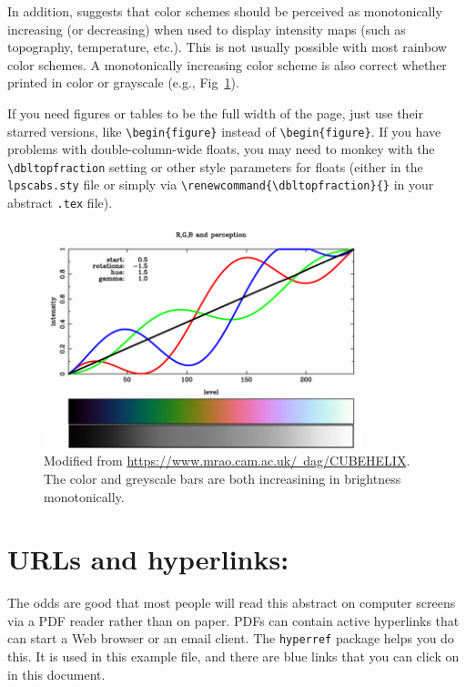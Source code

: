 \documentclass[twoside, 10pt]{article}
\begin{document}
In addition, \citep{green2011colour} suggests that color schemes
should be perceived as monotonically increasing (or decreasing)
when used to display intensity maps (such as
topography, temperature, etc.). This is not usually possible with 
most rainbow color schemes. A monotonically increasing color scheme 
is also correct whether printed in color or grayscale (e.g., Fig~\ref{SaturationColors}).

If you need figures or tables to be the full width of the page,
just use their starred versions, like \verb=\begin{figure}= instead
of \verb=\begin{figure}=.  If you have problems with double-column-wide
floats, you may need to monkey with the \verb=\dbltopfraction=
setting or other style parameters for floats (either in the
\texttt{lpscabs.sty} file or simply via
\verb=\renewcommand{\dbltopfraction}{}= in your abstract \texttt{.tex}
file).

\begin{figure}
\begin{center}
\includegraphics[width=0.825\textwidth]{rgb-grey-morehue.png}
\caption[CubeHelix Color Schemes]{
\label{SaturationColors}
    Modified from \href{https://www.mrao.cam.ac.uk/~dag/CUBEHELIX}{https://www.mrao.cam.ac.uk/~dag/CUBEHELIX}.
    The color and greyscale bars are both increasining in brightness monotonically.
    }
\end{center}
\end{figure}

\section*{URLs and hyperlinks:}

The odds are good that most people will read this
abstract on computer screens via a PDF reader rather than
on paper.  PDFs can contain active hyperlinks that can start a
Web browser or an email client. The
\verb=hyperref= package helps you do this.  It is used in this
example file, and there are blue links that you can click on in
this document.
\end{document}
